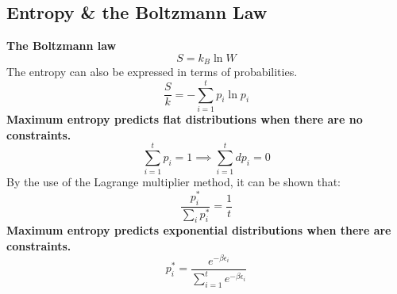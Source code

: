 \documentclass[8pt]{article}
\numberwithin{equation}{section}
\begin{document}
\begin{multicols}{2}
\setcounter{section}{4}
\section{Entropy \& the Boltzmann Law}
\textbf{The Boltzmann law}
\begin{equation}
S=k_{B} \ln{W} \label{eq:5.1}
\end{equation}
The entropy can also be expressed in terms of probabilities. 
\begin{equation}
\frac{S}{k}=-\sum_{i=1}^{t} p_{i}\ln{p_{i}}
\end{equation}
\textbf{Maximum entropy predicts flat distributions when there are no constraints.} 
\begin{equation}
\sum_{i=1}^{t} p_{i}=1 \implies \sum_{i=1}^{t}dp_{i}=0 \tag{5.5}
\end{equation}
By the use of the Lagrange multiplier method, it can be shown that: 
\begin{equation}
\frac{p_{i}^{*}}{\sum_{i}p_{i}^{*}}=\frac{1}{t} \tag{5.9}
\end{equation}
\textbf{Maximum entropy predicts exponential distributions when there are constraints.}
\begin{equation}
p_{i}^{*}=\frac{e^{-\beta \epsilon_{i}}}{\sum_{i=1}^{t}e^{-\beta \epsilon_{i}}} \tag{5.17}
\end{equation} 

\end{multicols}
\end{document}
